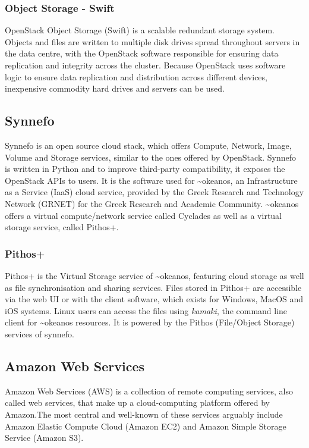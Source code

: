     \subsubsection{Object Storage - Swift}
      OpenStack Object Storage (Swift) is a scalable redundant storage system. Objects and files are written to multiple disk drives spread throughout servers in the data centre, with the OpenStack software responsible for ensuring data replication and integrity across the cluster. Because OpenStack uses software logic to ensure data replication and distribution across different devices, inexpensive commodity hard drives and servers can be used.


  \subsection{Synnefo}
    Synnefo\cite{synnefo} is an open source cloud stack, which offers Compute, Network, Image, Volume and Storage services, similar to the ones offered by OpenStack. Synnefo is written in Python and to improve third-party compatibility, it exposes the OpenStack APIs to users\cite{synnefo-api}. It is the software used for \textasciitilde okeanos\cite{okeanos}, an Infrastructure as a Service (IaaS) cloud service, provided by the Greek Research and Technology Network (GRNET) for the Greek Research and Academic Community. \textasciitilde okeanos offers a virtual compute/network service called Cyclades as well as a virtual storage service, called Pithos+.

    \subsubsection{Pithos+}
      Pithos+ is the Virtual Storage service of \textasciitilde okeanos, featuring cloud storage as well as file synchronisation and sharing services. Files stored in Pithos+ are accessible via the web UI or with the client software, which exists for Windows, MacOS and iOS systems. Linux users can access the files using \emph{kamaki}, the command line client for \textasciitilde okeanos resources. It is powered by the Pithos (File/Object Storage) services of synnefo.

  \subsection{Amazon Web Services}
    Amazon Web Services (AWS) is a collection of remote computing services, also called web services, that make up a cloud-computing platform offered by Amazon.The most central and well-known of these services arguably include Amazon Elastic Compute Cloud (Amazon EC2) and Amazon Simple Storage Service (Amazon S3).

